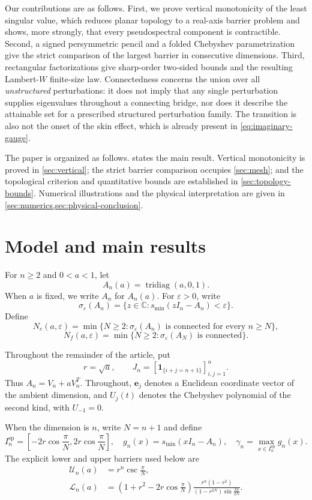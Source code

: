 \documentclass[review,hidelinks,onefignum,onetabnum]{siamart251216}
\DeclareMathOperator{\tridiag}{tridiag}
\newcommand{\C}{\mathbb C}
\begin{document}
Our contributions are as follows.  First, we prove vertical monotonicity
of the least singular value, which reduces planar topology to a real-axis
barrier problem and shows, more strongly, that every pseudospectral
component is contractible.  Second, a signed persymmetric pencil and a
folded Chebyshev parametrization give the strict comparison of the
largest barrier in consecutive dimensions.  Third, rectangular
factorizations give sharp-order two-sided bounds and the resulting
Lambert-$W$ finite-size law.  Connectedness concerns the union over all
\emph{unstructured} perturbations: it does not imply that any single
perturbation supplies eigenvalues throughout a connecting bridge, nor
does it describe the attainable set for a prescribed structured
perturbation family.  The transition is also not the onset of the skin
effect, which is already present in \eqref{eq:imaginary-gauge}.

The paper is organized as follows.   states the
main result.  Vertical monotonicity is proved in
\cref{sec:vertical}; the strict barrier comparison occupies
\cref{sec:mesh}; and the topological criterion and quantitative bounds
are established in \cref{sec:topology-bounds}.  Numerical illustrations
and the physical interpretation are given in
\cref{sec:numerics,sec:physical-conclusion}.

\section{Model and main results}\label{sec:main-results}

For $n\geq2$ and $0<a<1$, let
\[
 A_n(a)=\tridiag(a,0,1).
\]
When \(a\) is fixed, we write \(A_n\) for \(A_n(a)\).
For $\varepsilon>0$, write
\[
 \sigma_\varepsilon(A_n)=
 \{z\in\C:s_{\min}(zI_n-A_n)<\varepsilon\}.
\]
Define
\[
 N_e(a,\varepsilon)=\min\{N\geq2:
 \sigma_\varepsilon(A_n)\text{ is connected for every }n\geq N\},
\]
\[
 N_f(a,\varepsilon)=\min\{N\geq2:
 \sigma_\varepsilon(A_N)\text{ is connected}\}.
\]

Throughout the remainder of the article, put
\[
 r=\sqrt a,\qquad
 J_n=[\boldsymbol 1_{\{i+j=n+1\}}]_{i,j=1}^n.
\]
Thus \(A_n=V_n+aV_n^T\).  Throughout, \(\mathbf e_j\) denotes a Euclidean
coordinate vector of the ambient dimension, and \(U_j(t)\) denotes the
Chebyshev polynomial of the second kind, with \(U_{-1}=0\).

When the dimension is \(n\), write \(N=n+1\) and define
\begin{equation}\label{eq:main-definitions}
 I_n^{\mathrm{sp}}=
 \left[-2r\cos\frac{\pi}{N},2r\cos\frac{\pi}{N}\right],
 \quad
 g_n(x)=s_{\min}(xI_n-A_n),
 \quad
 \gamma_n=\max_{x\in I_n^{\mathrm{sp}}}g_n(x).
\end{equation}
The explicit lower and upper barriers used below are
\begin{align}
 \mathcal U_n(a)&=r^n\csc\frac{\pi}{N},\label{eq:main-U-def}\\
 \mathcal L_n(a)&=
 \left(1+r^2-2r\cos\frac{\pi}{N}\right)
 \frac{r^n(1-r^2)}
 {(1-r^{2N})\sin\frac{3\pi}{2N}}.\label{eq:main-L-def}
\end{align}
\end{document}
